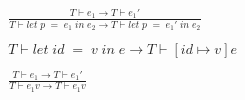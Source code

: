 \begin{figure}[htb]
\begin{align*}
\tag{E-Let}
&\frac{T \vdash e_{1}\rightarrow T \vdash e_{1}'}
{T \vdash let \; p \; = \; e_{1} \; in \; e_{2} \rightarrow T \vdash let \; p \; = \; e_{1}' \; in \; e_{2}}
\\ \\
\tag{E-LetV}
&T \vdash let \; id \; = \; v \; in \; e \rightarrow T \vdash [id \mapsto v]e \\ \\
\tag{E-App1}
&\frac{T \vdash e_{1} \rightarrow T \vdash e_{1}'}
{T \vdash e_{1} v \rightarrow T \vdash e_{1} v}
\\

\end{align*}
\end{figure}
